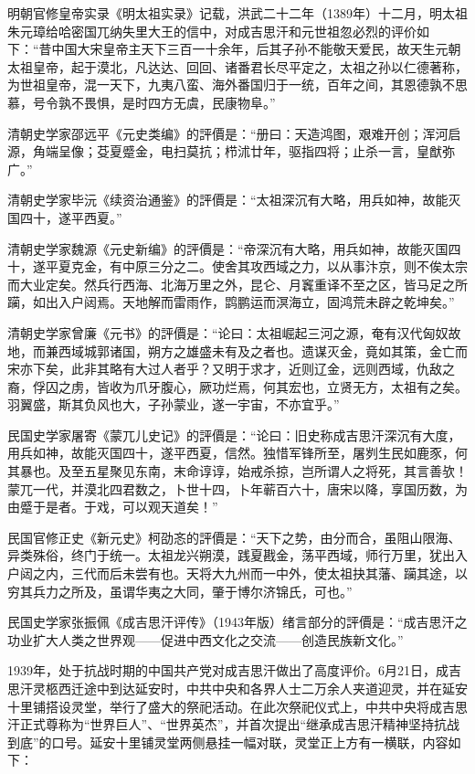 明朝官修皇帝实录《明太祖实录》记载，洪武二十二年（1389年）十二月，明太祖朱元璋给哈密国兀纳失里大王的信中，对成吉思汗和元世祖忽必烈的评价如下：“昔中国大宋皇帝主天下三百一十余年，后其子孙不能敬天爱民，故天生元朝太祖皇帝，起于漠北，凡达达、回回、诸番君长尽平定之，太祖之孙以仁德著称，为世祖皇帝，混一天下，九夷八蛮、海外番国归于一统，百年之间，其恩德孰不思慕，号令孰不畏惧，是时四方无虞，民康物阜。”

清朝史学家邵远平《元史类编》的評價是：“册曰：天造鸿图，艰难开创；浑河启源，角端呈像；芟夏蹙金，电扫莫抗；栉沭廿年，驱指四将；止杀一言，皇猷弥广。”

清朝史学家毕沅《续资治通鉴》的評價是：“太祖深沉有大略，用兵如神，故能灭国四十，遂平西夏。”

清朝史学家魏源《元史新编》的評價是：“帝深沉有大略，用兵如神，故能灭国四十，遂平夏克金，有中原三分之二。使舍其攻西域之力，以从事汴京，则不俟太宗而大业定矣。然兵行西海、北海万里之外，昆仑、月竁重译不至之区，皆马足之所躏，如出入户闼焉。天地解而雷雨作，鹍鹏运而溟海立，固鸿荒未辟之乾坤矣。”

清朝史学家曾廉《元书》的評價是：“论曰：太祖崛起三河之源，奄有汉代匈奴故地，而兼西域城郭诸国，朔方之雄盛未有及之者也。遗谋灭金，竟如其策，金亡而宋亦下矣，此非其略有大过人者乎？又明于求才，近则辽金，远则西域，仇敌之裔，俘囚之虏，皆收为爪牙腹心，厥功烂焉，何其宏也，立贤无方，太祖有之矣。羽翼盛，斯其负风也大，子孙蒙业，遂一宇宙，不亦宜乎。”

民国史学家屠寄《蒙兀儿史记》的評價是：“论曰：旧史称成吉思汗深沉有大度，用兵如神，故能灭国四十，遂平西夏，信然。独惜军锋所至，屠刿生民如鹿豕，何其暴也。及至五星聚见东南，末命谆谆，始戒杀掠，岂所谓人之将死，其言善欤！蒙兀一代，并漠北四君数之，卜世十四，卜年蕲百六十，唐宋以降，享国历数，为由蹙于是者。于戏，可以观天道矣！”

民国官修正史《新元史》柯劭忞的評價是：“天下之势，由分而合，虽阻山限海、异类殊俗，终门于统一。太祖龙兴朔漠，践夏戡金，荡平西域，师行万里，犹出入户闼之内，三代而后未尝有也。天将大九州而一中外，使太祖抉其藩、躏其途，以穷其兵力之所及，虽谓华夷之大同，肇于博尔济锦氏，可也。” 

民国史学家张振佩《成吉思汗评传》（1943年版）绪言部分的評價是：“成吉思汗之功业扩大人类之世界观——促进中西文化之交流——创造民族新文化。”

1939年，处于抗战时期的中国共产党对成吉思汗做出了高度评价。6月21日，成吉思汗灵柩西迁途中到达延安时，中共中央和各界人士二万余人夹道迎灵，并在延安十里铺搭设灵堂，举行了盛大的祭祀活动。在此次祭祀仪式上，中共中央将成吉思汗正式尊称为“世界巨人”、“世界英杰”，并首次提出“继承成吉思汗精神坚持抗战到底”的口号。延安十里铺灵堂两侧悬挂一幅对联，灵堂正上方有一横联，内容如下：

